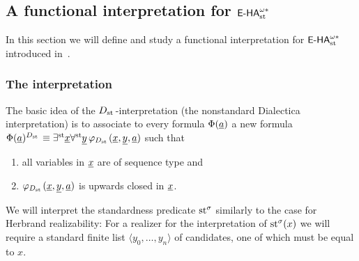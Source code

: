 %
%
%
\subsection{A functional interpretation for ${\textsf{\upshape E-HA}}^{\omega*}_{\operatorname{st}{}}\!$}\label{s:dst:dialectica}

In this section we will define and study a functional interpretation for ${\textsf{\upshape E-HA}}^{\omega*}_{\operatorname{st}{}}\!$
introduced in~\cite{BBS12}.

\subsubsection*{The interpretation}\label{ss:dst:dialectica}

The basic idea of the $\protect{D_{\operatorname{st}{}}}$-interpretation (the nonstandard Dialectica interpretation) is to associate to every formula $\Phi (\underline{a})$ a new formula $\Phi(\underline{a})^{\protect{D_{\operatorname{st}{}}}}\equiv\exists^{\operatorname{st}{}}\! \underline{x}\forall^{\operatorname{st}{}}\! \underline{y} \, \varphi_{\protect{D_{\operatorname{st}{}}}} (\underline{x},\underline{y},\underline{a})$
such that 
\begin{enumerate}
\item all variables in $\underline x$ are of sequence type and
\item $\varphi_{\protect{D_{\operatorname{st}{}}}} (\underline{x},\underline{y},\underline{a})$ is upwards closed in $\underline{x}$.
\end{enumerate}
We will interpret the standardness predicate $\operatorname{st}^{\sigma}$ similarly to the case for Herbrand realizability: For a realizer for the interpretation of $\operatorname{st}^{\sigma}(x)$ we will require a standard finite list $\langle y_0,\ldots,y_n \rangle$ of candidates, one of which must be equal to $x$.

